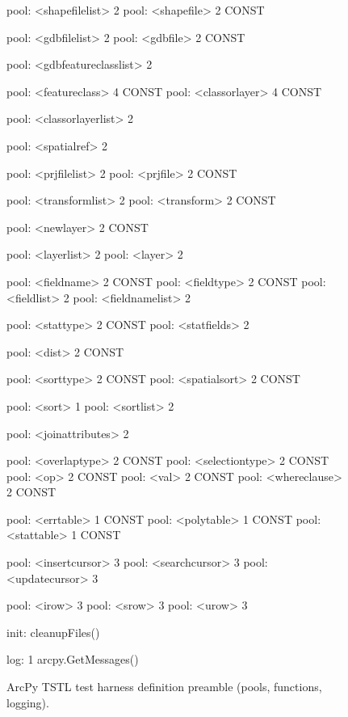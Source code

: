 \begin{figure}
{\begin{code}
pool: <shapefilelist> 2
pool: <shapefile> 2 CONST

pool: <gdbfilelist> 2
pool: <gdbfile> 2 CONST

pool: <gdbfeatureclasslist> 2

pool: <featureclass> 4 CONST
pool: <classorlayer> 4 CONST

pool: <classorlayerlist> 2

pool: <spatialref> 2

pool: <prjfilelist> 2
pool: <prjfile> 2 CONST

pool: <transformlist> 2
pool: <transform> 2 CONST

pool: <newlayer> 2 CONST

pool: <layerlist> 2
pool: <layer> 2

pool: <fieldname> 2 CONST
pool: <fieldtype> 2 CONST
pool: <fieldlist> 2
pool: <fieldnamelist> 2

pool: <stattype> 2 CONST
pool: <statfields> 2

pool: <dist> 2 CONST

pool: <sorttype> 2 CONST
pool: <spatialsort> 2 CONST

pool: <sort> 1
pool: <sortlist> 2

pool: <joinattributes> 2

pool: <overlaptype> 2 CONST
pool: <selectiontype> 2 CONST
pool: <op> 2 CONST
pool: <val> 2 CONST
pool: <whereclause> 2 CONST

pool: <errtable> 1 CONST
pool: <polytable> 1 CONST
pool: <stattable> 1 CONST

pool: <insertcursor> 3
pool: <searchcursor> 3
pool: <updatecursor> 3

pool: <irow> 3
pool: <srow> 3
pool: <urow> 3

init: cleanupFiles()

log: 1 arcpy.GetMessages()
\end{code}
}
\caption{ArcPy TSTL test harness definition preamble (pools, functions, logging).}
\label{preamble}
\end{figure}

